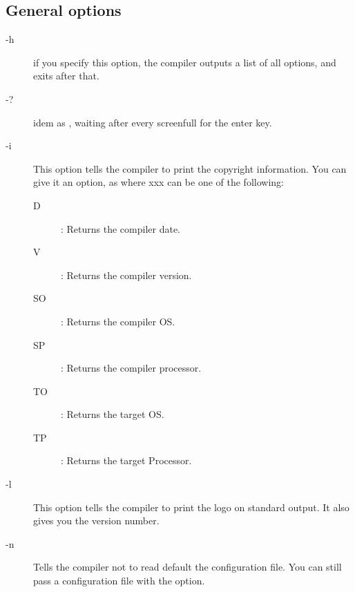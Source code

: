 \subsection{General options}
\begin{description}
\item[-h] if you specify this option, the compiler outputs a list of all options,
and exits after that.
\item[-?] idem as , waiting after every screenfull for the enter key.
\item[-i] This option tells the compiler to print the copyright information.
 You can give it an option, as  where xxx can be one of the
following:
\begin{description}
\item[D] : Returns the compiler date.
\item[V] : Returns the compiler version.
\item[SO] : Returns the compiler OS.
\item[SP] : Returns the compiler processor.
\item[TO] : Returns the target OS.
\item[TP] : Returns the target Processor.
\end{description}
\item[-l] This option tells the compiler to print the \fpc logo on standard
output. It also gives you the \fpc version number.
\item [-n] Tells the compiler not to read default the configuration file.
You can still pass a configuration file with the  option.
\end{description}

%
%
